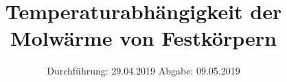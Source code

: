 

\subject{Versuch 47}
\title{Temperaturabhängigkeit der Molwärme von Festkörpern}
\date{%
  Durchführung: 29.04.2019
  \hspace{3em}
  Abgabe: 09.05.2019
}



\maketitle
\thispagestyle{empty}
\tableofcontents
\newpage






\printbibliography{}


